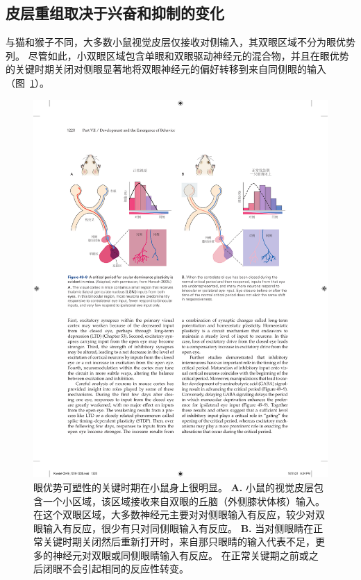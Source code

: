 \subsection{皮层重组取决于兴奋和抑制的变化}

与猫和猴子不同，大多数小鼠视觉皮层仅接收对侧输入，其双眼区域不分为眼优势列。
尽管如此，小双眼区域包含单眼和双眼驱动神经元的混合物，并且在眼优势的关键时期关闭对侧眼显著地将双眼神经元的偏好转移到来自同侧眼的输入（图~\ref{fig:49_8}）。


\begin{figure}[htbp]
	\centering
	\includegraphics[width=1.0\linewidth]{chap49/fig_49_8}
	\caption{眼优势可塑性的关键时期在小鼠身上很明显\cite{hensch2005critical}。
		\textbf{A.} 小鼠的视觉皮层包含一个小区域，该区域接收来自双眼的丘脑（外侧膝状体核）输入。
		在这个双眼区域，大多数神经元主要对对侧眼输入有反应，较少对双眼输入有反应，很少有只对同侧眼输入有反应。
		\textbf{B.} 当对侧眼睛在正常关键时期关闭然后重新打开时，来自那只眼睛的输入代表不足，更多的神经元对双眼或同侧眼睛输入有反应。
		在正常关键期之前或之后闭眼不会引起相同的反应性转变。}
	\label{fig:49_8}
\end{figure}


